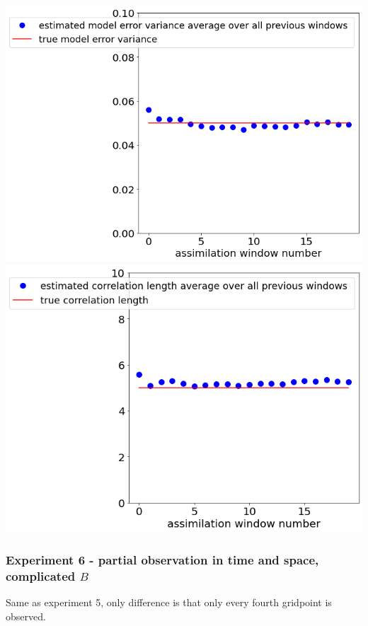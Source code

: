 \documentclass[a4paper,10pt]{article}
\numberwithin{equation}{section}
\begin{document}
\includegraphics[scale=0.4]{Ex5meanvar}\hspace{-3cm}
\includegraphics[scale=0.4]{Ex5meanlen}

\subsubsection*{Experiment 6 - partial observation in time and space, complicated $B$}
Same as experiment 5, only difference is that only every fourth gridpoint is observed. 
\end{document}
